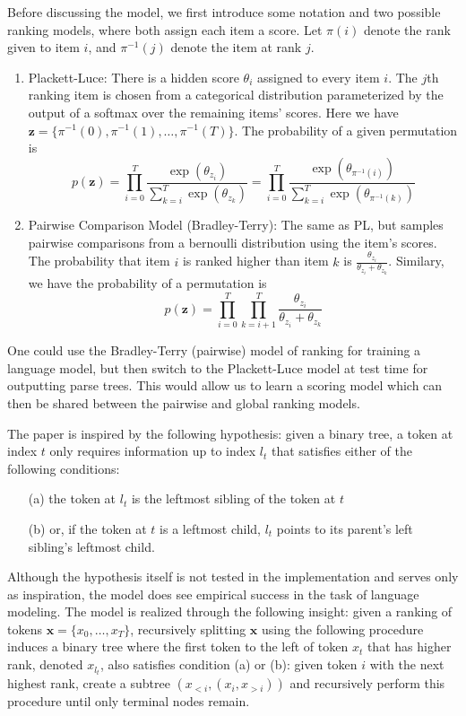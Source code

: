 \documentclass{article}
\newcommand{\bx}{\mathbf{x}}
\newcommand{\bz}{\mathbf{z}}
\begin{document}
Before discussing the \citet{shen2018prpn} model, we first introduce
some notation and two possible ranking models, where both assign each item a score.
Let $\pi(i)$ denote the rank given to item $i$, and $\pi^{-1}(j)$ denote the 
item at rank $j$.
\begin{enumerate}
\item Plackett-Luce:
There is a hidden score $\theta_i$ assigned to every item $i$.
The $j$th ranking item is chosen from a categorical distribution 
parameterized by the output of a softmax over the remaining items' scores.
Here we have $\bz = \{\pi^{-1}(0),\pi^{-1}(1),\ldots,\pi^{-1}(T)\}$.
The probability of a given permutation is
$$
p(\bz)
= \prod_{i=0}^T\frac{\exp(\theta_{z_i})}{\sum_{k=i}^T \exp(\theta_{z_k})}
= \prod_{i=0}^T\frac{\exp(\theta_{\pi^{-1}(i)})}{\sum_{k=i}^T \exp(\theta_{\pi^{-1}(k)})}
$$
\item Pairwise Comparison Model (Bradley-Terry):
The same as PL, but samples pairwise comparisons from a bernoulli distribution
using the item's scores.
The probability that item $i$ is ranked higher than item $k$ is 
$\frac{\theta_{z_i}}{\theta_{z_i}+\theta_{z_k}}$.
Similary, we have the probability of a permutation is
$$
p(\bz) 
= \prod_{i=0}^T\prod_{k=i+1}^T\frac{\theta_{z_i}}{\theta_{z_i}+\theta_{z_k}}
$$
\end{enumerate}
One could use the Bradley-Terry (pairwise)
model of ranking for training a language model,
but then switch to the Plackett-Luce model at test time for outputting parse trees.
This would allow us to learn a scoring model which can then be shared between the 
pairwise and global ranking models.

The paper is inspired by the following hypothesis:
given a binary tree, a token at index $t$ only requires information up to index $l_t$ that satisfies
either of the following conditions:
\begin{itemize}
\item[(a)] the token at $l_t$ is the leftmost sibling of the token at $t$
\item[(b)] or, if the token at $t$ is a leftmost child, $l_t$ points to its parent's left sibling's leftmost child.
\end{itemize}
Although the hypothesis itself is not tested in the implementation and serves only as inspiration,
the model does see empirical success in the task of language modeling.
The model is realized through the following insight: given a ranking of tokens $\bx = \{x_0,\ldots,x_T\}$,
recursively splitting $\bx$ using the following procedure induces a binary tree where the first token to the left
of token $x_t$ that has higher rank, denoted $x_{l_t}$, also satisfies condition (a) or (b):
given token $i$ with the next highest rank, create a subtree $(x_{<i}, (x_i, x_{>i}))$ and
recursively perform this procedure until only terminal nodes remain.
\end{document}
